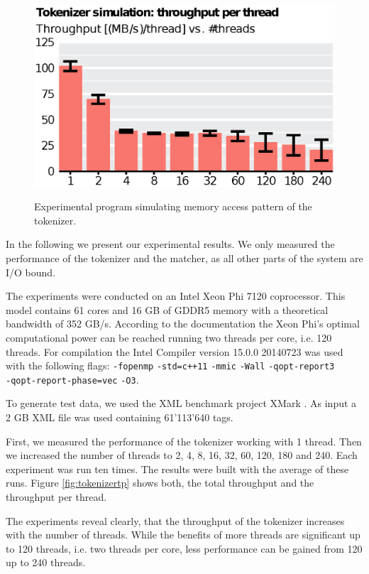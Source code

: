 \begin{figure}
    \includegraphics[scale=.45]{img/def/tokenizer_sim.eps} 
    \label{fig:tokenizersim}
    \caption{Experimental program simulating memory access pattern of the
    tokenizer.}
\end{figure}


In the following we present our experimental results. We only measured the
performance of the tokenizer and the matcher, as all other parts of the system
are I/O bound.

 The experiments were conducted on an Intel Xeon Phi
7120 coprocessor. This model contains 61 cores and 16 GB of GDDR5 memory with a
theoretical bandwidth of 352 GB/s. According to the documentation the Xeon Phi's
optimal computational power can be reached running two threads per core, i.e.
120 threads. For compilation the Intel Compiler version 15.0.0 20140723 was used
with the following flags: \verb;-fopenmp; \verb;-std=c++11; \verb;-mmic;
\verb;-Wall; \verb;-qopt-report3; \\ \verb;-qopt-report-phase=vec; \verb;-O3;.

To generate test data, we used the XML benchmark project XMark
\cite{Schmidt2002}. As input a 2 GB XML file was used containing 61'113'640
tags. 

 First, we measured the performance of the tokenizer working
with 1 thread. Then we increased the number of threads to 2, 4, 8, 16, 32, 60,
120, 180 and 240.  Each experiment was run ten times. The results were built
with the average of these runs. Figure \ref{fig:tokenizertp} shows both, the
total throughput and the throughput per thread.

The experiments reveal clearly, that the throughput of the tokenizer increases
with the number of threads. While the benefits of more threads are significant
up to 120 threads, i.e. two threads per core, less performance can be gained
from 120 up to 240 threads.


